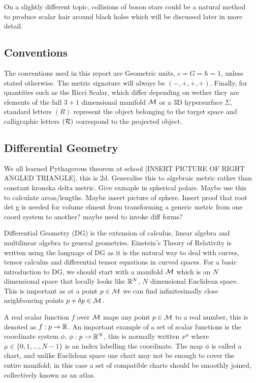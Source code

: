 On a slightly different topic, collisions of boson stars could be a natural method to produce scalar hair around black holes which will be discussed later in more detail. 

\subsection{Conventions}
The conventions used in this report are Geometric units, $c=G=\hbar=1$, unless stated otherwise. The metric signature will always be $(-,+,+,+)$. Finally, for quantities such as the Ricci Scalar, which differ depending on wether they are elements of the full $3+1$ dimensional manifold $\mathcal{M}$ or a $3$D hypersurface $\Sigma$, standard letters $(R)$ represent the object belonging to the target space and calligraphic letters $(\mathcal{R})$ correspond to the projected object.




\subsection{Differential Geometry}
We all learned Pythagerous theorem at school [INSERT PICTURE OF RIGHT ANGLED TRIANGLE], this is 2d. Generalise this to algebraic metric rather than constant kroneka delta metric. Give exmaple in spherical polars. Maybe use this to calculate areas/lengths. Maybe insert picture of sphere. Insert proof that root det g is needed for volume elment from transforming a generic metric from one coord system to another? maybe need to invoke diff forms?

Differential Geometry (DG) is the extension of calculus, linear algebra and multilinear algebra to general
geometries. Einstein’s Theory of Relativity is written using the language of DG as it is the natural
way to deal with curves, tensor calculus and differential tensor equations in curved spaces. For a basic
introduction to DG, we should start with a manifold $\mathcal{M}$ which is an $N$ dimensional space that locally looks
like $\mathbb{R}^N$, $N$ dimensional Euclidean space. This is important as at a point $p\in\mathcal{M}$ we can find infinitesimally
close neighbouring points $p + \delta p \in \mathcal{M}$. 

A real scalar function $f$ over $\mathcal{M}$ maps any point $p\in \mathcal{M}$ to a real number, this is denoted as
$f : p \rightarrow \mathbb{R}$. An important example of a set of scalar functions is the coordinate system $\phi$, $\phi : p \rightarrow \mathbb{R}^N$,
this is normally written $x^\mu$ where $\mu\in\{0,1,...,N-1\}$ is an index labelling the coordinate. The map $\phi$ is called a chart,
and unlike Euclidean space one chart may not be enough to cover the entire manifold; in this case a set
of compatible charts should be smoothly joined, collectively known as an atlas.

